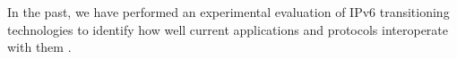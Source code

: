 In the past, we have performed an experimental evaluation of IPv6
transitioning technologies to identify how well current applications and
protocols interoperate with them \cite{vbajpai:2012}.

